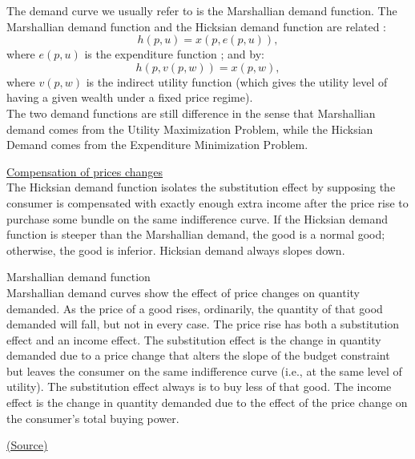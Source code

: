 \documentclass[a4paper, 12pt, reqno]{article}
\begin{document}
The demand curve we usually refer to is the Marshallian demand function. The Marshallian demand function and the Hicksian demand function are related :
$$h(p,u) = x(p,e(p,u)),$$
where $e(p,u)$ is the expenditure function ; and by:
$$h(p, v(p,w)) = x(p,w),$$
where $v(p,w)$ is the indirect utility function (which gives the utility level of having a given wealth under a fixed price regime). \\
The two demand functions are still difference in the sense that Marshallian demand comes from the Utility Maximization Problem, while the Hicksian Demand comes from the Expenditure Minimization Problem.

\underline{Compensation of prices changes} \\
The Hicksian demand function isolates the substitution effect by supposing the consumer is compensated with exactly enough extra income after the price rise to purchase some bundle on the same indifference curve. If the Hicksian demand function is steeper than the Marshallian demand, the good is a normal good; otherwise, the good is inferior. 
Hicksian demand always slopes down.
\begin{tcolorbox}
    Marshallian demand function\\
    Marshallian demand curves show the effect of price changes on quantity demanded. As the price of a good rises, ordinarily, the quantity of that good demanded will fall, but not in every case. 
    The price rise has both a substitution effect and an income effect. The substitution effect is the change in quantity demanded due to a price change that alters the slope of the budget constraint but leaves the consumer on the same indifference curve 
    (i.e., at the same level of utility). The substitution effect always is to buy less of that good. The income effect is the change in quantity demanded due to the effect of the price change on the consumer's total buying power. 
\end{tcolorbox}
\href{https://en.wikipedia.org/wiki/Hicksian_demand_function}{(Source)}
\end{document}
